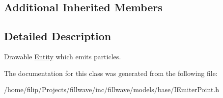 \subsection*{Additional Inherited Members}


\subsection{Detailed Description}
Drawable \hyperlink{classflw_1_1flf_1_1Entity}{Entity} which emits particles. 

The documentation for this class was generated from the following file\+:\begin{DoxyCompactItemize}
\item 
/home/filip/\+Projects/fillwave/inc/fillwave/models/base/I\+Emiter\+Point.\+h\end{DoxyCompactItemize}
